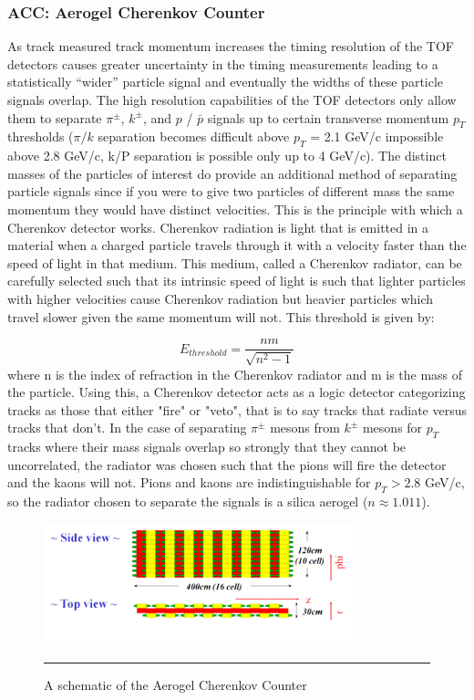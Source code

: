 \subsubsection{ACC: Aerogel Cherenkov Counter}
As track measured track momentum increases the timing resolution of the TOF detectors causes greater uncertainty in the timing measurements leading to a statistically ``wider'' particle signal and eventually the widths of these particle signals overlap. The high resolution capabilities of the TOF detectors only allow them to separate $\pi^{\pm}$, $k^{\pm}$, and $p$ / $\bar{p}$ signals up to certain transverse momentum $p_{T}$ thresholds ($\pi/k$ separation becomes difficult above $p_T$ = 2.1 GeV/c impossible above 2.8 GeV/c, k/P separation is possible only up to 4 GeV/c). The distinct masses of the particles of interest do provide an additional method of separating particle signals since if you were to give two particles of different mass the same momentum they would have distinct velocities. This is the principle with which a Cherenkov detector works. Cherenkov radiation is light that is emitted in a material when a charged particle travels through it with a velocity faster than the speed of light in that medium. This medium, called a Cherenkov radiator, can be carefully selected such that its intrinsic speed of light is such that lighter particles with higher velocities cause Cherenkov radiation but heavier particles which travel slower given the same momentum will not. This threshold is given by:

\begin{equation}
E_{threshold} = \frac{nm}{\sqrt{n^2-1}}
\end{equation}
where n is the index of refraction in the Cherenkov radiator and m is the mass of the particle.
Using this, a Cherenkov detector acts as a logic detector categorizing tracks as those that either "fire" or "veto", that is to say tracks that radiate versus tracks that don't. In the case of separating $\pi^{\pm}$ mesons from $k^{\pm}$ mesons for $p_{T}$ tracks where their mass signals overlap so strongly that they cannot be uncorrelated, the radiator was chosen such that the pions will fire the detector and the kaons will not. Pions and kaons are indistinguishable for $p_{T} > 2.8$ GeV/c, so the radiator chosen to separate the signals is a silica aerogel ($n \approx 1.011$).

\begin{figure}[htbp!]
  \centering
    \includegraphics[width=0.8\textwidth]{Figures/ACCschematic.jpg}
    \rule{35em}{0.5pt}
  \caption[A schematic of the Aerogel Cherenkov Counter]{A schematic of the Aerogel Cherenkov Counter}
  \label{fig:ACCschematic}
\end{figure}

